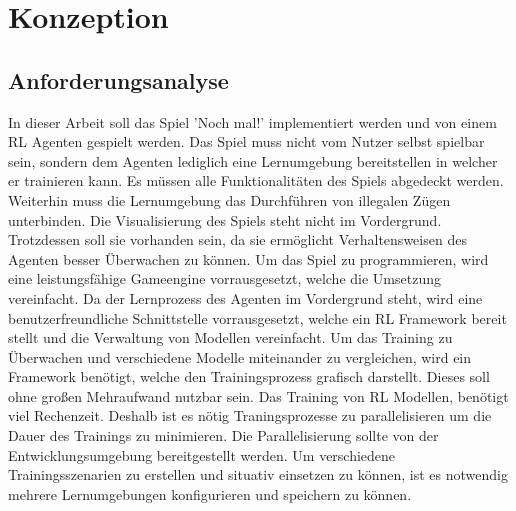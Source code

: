 
\clearpage
\chapter{Konzeption}

\section{Anforderungsanalyse}
In dieser Arbeit soll das Spiel 'Noch mal!' implementiert werden und von einem RL Agenten gespielt werden. Das Spiel muss nicht vom Nutzer selbst spielbar sein, sondern dem Agenten lediglich eine Lernumgebung bereitstellen in welcher er trainieren kann. Es müssen alle Funktionalitäten des Spiels abgedeckt werden. Weiterhin muss die Lernumgebung das Durchführen von illegalen Zügen unterbinden.
Die Visualisierung des Spiels steht nicht im Vordergrund. Trotzdessen soll sie vorhanden sein, da sie ermöglicht Verhaltensweisen des Agenten besser Überwachen zu können. Um das Spiel zu programmieren, wird eine leistungsfähige Gameengine vorrausgesetzt, welche die Umsetzung vereinfacht. Da der Lernprozess des Agenten im Vordergrund steht, wird eine benutzerfreundliche Schnittstelle vorrausgesetzt, welche ein RL Framework bereit stellt und die Verwaltung von Modellen vereinfacht. Um das Training zu Überwachen und verschiedene Modelle miteinander zu vergleichen, wird ein Framework benötigt, welche den Trainingsprozess grafisch darstellt. Dieses soll ohne großen Mehraufwand nutzbar sein. Das Training von RL Modellen, benötigt viel Rechenzeit. Deshalb ist es nötig Traningsprozesse zu parallelisieren um die Dauer des Trainings zu minimieren. Die Parallelisierung sollte von der Entwicklungsumgebung bereitgestellt werden. Um verschiedene Trainingsszenarien zu erstellen und situativ einsetzen zu können, ist es notwendig mehrere Lernumgebungen konfigurieren und speichern zu können.  

